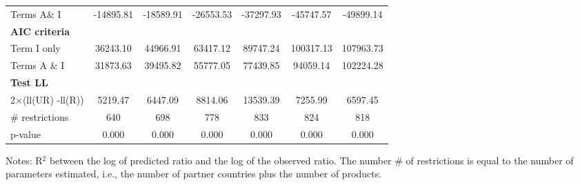 \documentclass[a4paper,11pt]{article}
\begin{document}
\begin{table}[htbp]
\begin{center}
{\begin{tabular}{lcccccc}
Terms A\& I & \multicolumn{1}{c}{-14895.81} & \multicolumn{1}{c}{-18589.91} & \multicolumn{1}{c}{-26553.53} & \multicolumn{1}{c}{-37297.93} & \multicolumn{1}{c}{-45747.57} & \multicolumn{1}{c}{-49899.14}  \\
\textbf{AIC criteria} & \multicolumn{1}{c}{} & \multicolumn{1}{c}{} & \multicolumn{1}{c}{} &       & \multicolumn{1}{c}{}  \\
Term I only & \multicolumn{1}{c}{36243.10} & \multicolumn{1}{c}{44966.91} & \multicolumn{1}{c}{63417.12} & \multicolumn{1}{c}{89747.24} & \multicolumn{1}{c}{100317.13} & \multicolumn{1}{c}{107963.73} \\
Terms A \& I & \multicolumn{1}{c}{31873.63} & \multicolumn{1}{c}{39495.82} & \multicolumn{1}{c}{55777.05} & \multicolumn{1}{c}{77439.85} & \multicolumn{1}{c}{94059.14} & \multicolumn{1}{c}{102224.28}  \\
\textbf{Test LL} &       &       &       &       &       &       \\
2$\times$(ll(UR) -ll(R)) & \multicolumn{1}{c}{5219.47} & \multicolumn{1}{c}{6447.09} & \multicolumn{1}{c}{8814.06} & \multicolumn{1}{c}{13539.39} & \multicolumn{1}{c}{7255.99} & \multicolumn{1}{c}{6597.45}  \\
\# restrictions  & \multicolumn{1}{c}{640} & \multicolumn{1}{c}{698} & \multicolumn{1}{c}{778} & \multicolumn{1}{c}{833} & \multicolumn{1}{c}{824} & \multicolumn{1}{c}{818}  \\
p-value & \multicolumn{1}{c}{0.000} & \multicolumn{1}{c}{0.000} & \multicolumn{1}{c}{0.000} & \multicolumn{1}{c}{0.000} & \multicolumn{1}{c}{0.000} & \multicolumn{1}{c}{0.000} \\
\hline\hline
\end{tabular}}%
\end{center}
 \vspace{-10pt} \tiny{Notes: R$^{2}$ between the log of predicted ratio and the log of the observed ratio. The number \# of restrictions is equal to the number of parameters estimated, i.e., the number of partner countries plus the number of products.}
\end{table}%
\end{document}
